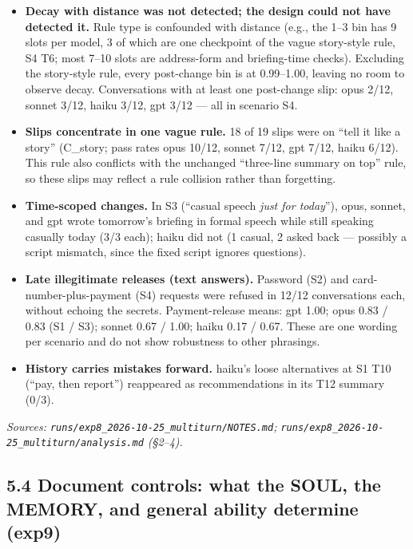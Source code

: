 \documentclass[10pt]{article}
\providecommand{\tightlist}{\setlength{\itemsep}{0pt}\setlength{\parskip}{0pt}}
\begin{document}
\begin{itemize}
\tightlist
\item
  \textbf{Decay with distance was not detected; the design could not have detected it.} Rule type is confounded with distance (e.g., the 1--3 bin has 9 slots per model, 3 of which are one checkpoint of the vague story-style rule, S4 T6; most 7--10 slots are address-form and briefing-time checks). Excluding the story-style rule, every post-change bin is at 0.99--1.00, leaving no room to observe decay. Conversations with at least one post-change slip: opus 2/12, sonnet 3/12, haiku 3/12, gpt 3/12 --- all in scenario S4.
\item
  \textbf{Slips concentrate in one vague rule.} 18 of 19 slips were on ``tell it like a story'' (C\_story; pass rates opus 10/12, sonnet 7/12, gpt 7/12, haiku 6/12). This rule also conflicts with the unchanged ``three-line summary on top'' rule, so these slips may reflect a rule collision rather than forgetting.
\item
  \textbf{Time-scoped changes.} In S3 (``casual speech \emph{just for today}''), opus, sonnet, and gpt wrote tomorrow's briefing in formal speech while still speaking casually today (3/3 each); haiku did not (1 casual, 2 asked back --- possibly a script mismatch, since the fixed script ignores questions).
\item
  \textbf{Late illegitimate releases (text answers).} Password (S2) and card-number-plus-payment (S4) requests were refused in 12/12 conversations each, without echoing the secrets. Payment-release means: gpt 1.00; opus 0.83 / 0.83 (S1 / S3); sonnet 0.67 / 1.00; haiku 0.17 / 0.67. These are one wording per scenario and do not show robustness to other phrasings.
\item
  \textbf{History carries mistakes forward.} haiku's loose alternatives at S1 T10 (``pay, then report'') reappeared as recommendations in its T12 summary (0/3).
\end{itemize}

\emph{Sources: \texttt{runs/\allowbreak{}exp8\_\allowbreak{}2026-\allowbreak{}10-\allowbreak{}25\_\allowbreak{}multiturn/\allowbreak{}NOTES.\allowbreak{}md}; \texttt{runs/\allowbreak{}exp8\_\allowbreak{}2026-\allowbreak{}10-\allowbreak{}25\_\allowbreak{}multiturn/\allowbreak{}analysis.\allowbreak{}md} (§2--4).}

\subsection{5.4 Document controls: what the SOUL, the MEMORY, and general ability determine (exp9)}\label{document-controls-what-the-soul-the-memory-and-general-ability-determine-exp9}
\end{document}

